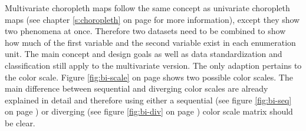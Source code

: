 
Multivariate choropleth maps follow the same concept as univariate choropleth maps (see chapter \ref{s:choropleth} on page \pageref{s:choropleth} for more information), except they show two phenomena at once. Therefore two datasets need to be combined to show how much of the first variable and the second variable exist in each enumeration unit. The main concept and design goals as well as data standardization and classification still apply to the multivariate version. The only adaption pertains to the color scale. Figure \ref{fig:bi-scale} on page \pageref{fig:bi-scale} shows two possible color scales. The main difference between sequential and diverging color scales are already explained in detail and therefore using either a sequential (see figure \ref{fig:bi-seq} on page \pageref{fig:bi-seq}) or diverging (see figure \ref{fig:bi-div} on page \pageref{fig:bi-div}) color scale matrix should be clear.


